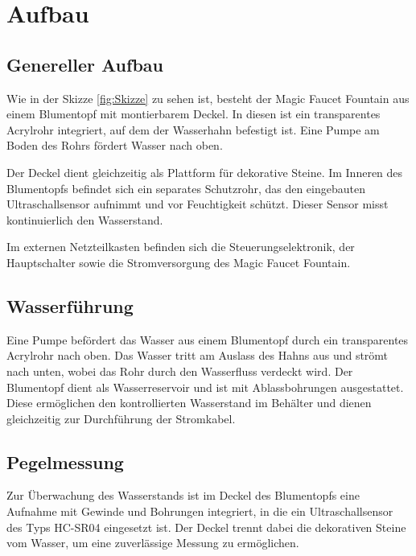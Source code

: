 %
%
%

\chapter{Aufbau}
\section{Genereller Aufbau}
Wie in der Skizze \ref{fig:Skizze} zu sehen ist, besteht der Magic Faucet Fountain aus einem Blumentopf mit montierbarem Deckel. In diesen ist ein transparentes Acrylrohr integriert, auf dem der Wasserhahn befestigt ist. Eine Pumpe am Boden des Rohrs fördert Wasser nach oben.

Der Deckel dient gleichzeitig als Plattform für dekorative Steine. Im Inneren des Blumentopfs befindet sich ein separates Schutzrohr, das den eingebauten Ultraschallsensor aufnimmt und vor Feuchtigkeit schützt. Dieser Sensor misst kontinuierlich den Wasserstand.

Im externen Netzteilkasten befinden sich die Steuerungselektronik, der Hauptschalter sowie die Stromversorgung des Magic Faucet Fountain.

\section{Wasserführung}
Eine Pumpe befördert das Wasser aus einem Blumentopf durch ein transparentes Acrylrohr nach oben. Das Wasser tritt am Auslass des Hahns aus und strömt nach unten, wobei das Rohr durch den Wasserfluss verdeckt wird.
Der Blumentopf dient als Wasserreservoir und ist mit Ablassbohrungen ausgestattet. Diese ermöglichen den kontrollierten Wasserstand im Behälter und dienen gleichzeitig zur Durchführung der Stromkabel.

\section{Pegelmessung}
Zur Überwachung des Wasserstands ist im Deckel des Blumentopfs eine Aufnahme mit Gewinde und Bohrungen integriert, in die ein Ultraschallsensor des Typs HC-SR04 eingesetzt ist. Der Deckel trennt dabei die dekorativen Steine vom Wasser, um eine zuverlässige Messung zu ermöglichen.

